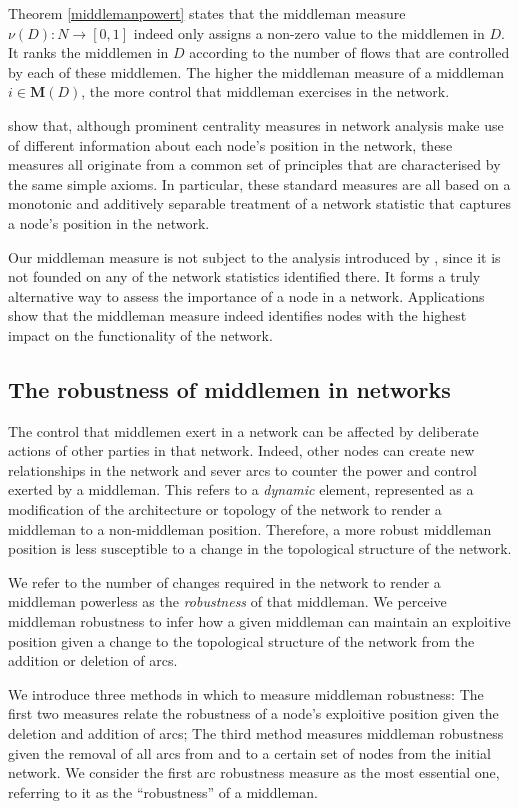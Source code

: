 \noindent
Theorem \ref{middlemanpowert} states that the middleman measure $\nu (D) \colon N \to [0,1]$ indeed only assigns a non-zero value to the middlemen in $D$. It ranks the middlemen in $D$ according to the number of flows that are controlled by each of these middlemen. The higher the middleman measure of a middleman $i \in \mathbf M (D)$, the more control that middleman exercises in the network.

\citet{BlochJackson2016} show that, although prominent centrality measures in network analysis make use of different information about each node's position in the network, these measures all originate from a common set of principles that are characterised by the same simple axioms. In particular, these standard measures are all based on a monotonic and additively separable treatment of a network statistic that captures a node's position in the network.

Our middleman measure is not subject to the analysis introduced by \citet{BlochJackson2016}, since it is not founded on any of the network statistics identified there. It forms a truly alternative way to assess the importance of a node in a network. Applications show that the middleman measure indeed identifies nodes with the highest impact on the functionality of the network.

\subsection{The robustness of middlemen in networks}

The control that middlemen exert in a network can be affected by deliberate actions of other parties in that network. Indeed, other nodes can create new relationships in the network and sever arcs to counter the power and control exerted by a middleman. This refers to a \emph{dynamic} element, represented as a modification of the architecture or topology of the network to render a middleman to a non-middleman position. Therefore, a more robust middleman position is less susceptible to a change in the topological structure of the network.

We refer to the number of changes required in the network to render a middleman powerless as the \emph{robustness} of that middleman. We perceive middleman robustness to infer how a given middleman can maintain an exploitive position given a change to the topological structure of the network from the addition or deletion of arcs.

We introduce three methods in which to measure middleman robustness: The first two measures relate the robustness of a node's exploitive position given the deletion and addition of arcs; The third method measures middleman robustness given the removal of all arcs from and to a certain set of nodes from the initial network. We consider the first arc robustness measure as the most essential one, referring to it as the ``robustness'' of a middleman.

